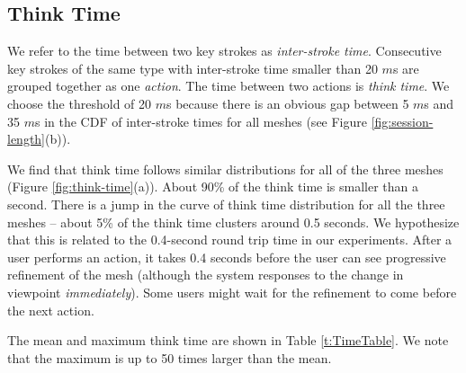 \subsection{Think Time}
We refer to the time between two key strokes as \textit{inter-stroke time}. 
Consecutive key strokes of the same type with inter-stroke time smaller than 20 $m$s
are grouped together as one \textit{action}. 
The time between two actions is \textit{think time}. 
We choose the threshold of 20 $m$s because there is an obvious gap between 5 $m$s and 35 $m$s
in the CDF of inter-stroke times for all meshes (see Figure \ref{fig:session-length}(b)).

 


We find that think time follows similar distributions for all of the three meshes (Figure \ref{fig:think-time}(a)). 
About 90\% of the think time is smaller than a second. There is a jump in the curve of think time distribution for all the three meshes -- 
about 5\% of the think time clusters around 0.5 seconds. 
We hypothesize that this is related to the 0.4-second round trip time in our experiments. 
After a user performs an action, it takes 0.4 seconds before the user can see progressive refinement of the mesh
(although the system responses to the change in viewpoint \textit{immediately}). 
Some users might wait for the refinement to come before the next action.

The mean and maximum think time are shown in Table \ref{t:TimeTable}. We note that the maximum is up to 50 times larger than the mean.


